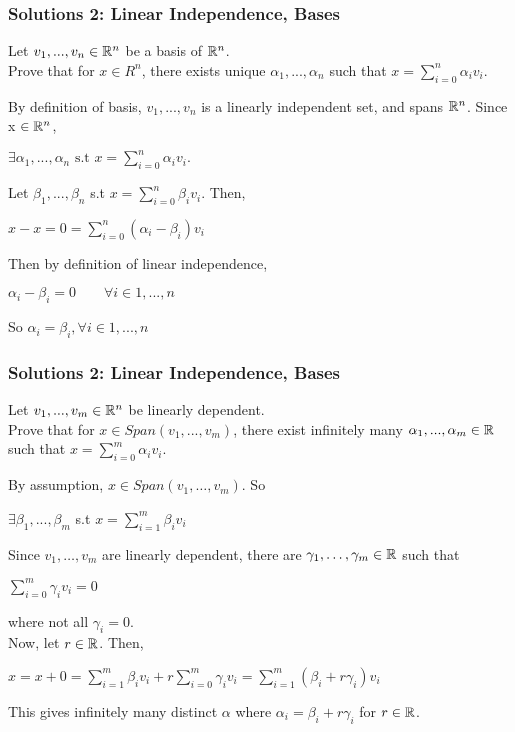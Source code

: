 \documentclass{beamer}
\newcommand\fonteight{\fontsize{8}{9.6}\selectfont}
\renewenvironment{enumerate}%
{\begin{list}{\arabic{enumi}.}%
      {\setlength{\leftmargin}{2.5em}%
       \setlength{\itemsep}{-\parsep}%
       \setlength{\topsep}{-\parskip}%
       \usecounter{enumi}}%
 }{\end{list}}
\begin{document}
\begin{frame}
\frametitle{Solutions 2: Linear Independence, Bases}
\begin{enumerate}
	\item[2.] Let $v_1,...,v_n \in \mathbb{R}^n$ be a basis of $\mathbb{R}^n$. \\
		Prove that for $x \in R^n$, there exists unique $\alpha_1,...,\alpha_n$
		such that $x = \sum_{i=0}^n \alpha_i v_i$.
	\begin{solution}
	By definition of basis, $v_1,...,v_n$ is a linearly independent set, and spans $\mathbb{R}^n$. Since x $\in \mathbb{R}^n$, 
	\begin{center}
		$\exists \alpha_1,...,\alpha_n \text{ s.t } x = \sum_{i=0}^n \alpha_i v_i.$ 
	\end{center}
	Let $\beta_1,...,\beta_n$ s.t $x = \sum_{i=0}^n \beta_i v_i$. Then,
	\begin{center}
		$x-x=0=\sum_{i=0}^n (\alpha_i-\beta_i) v_i$
	\end{center} 
	Then by definition of linear independence, 
	\begin{center}
		$\alpha_i-\beta_i=0  \qquad \forall i \in 1,...,n$
	\end{center}
	So $\alpha_i=\beta_i, \forall i \in 1,...,n$ 
	\end{solution}
\end{enumerate}
\end{frame}

\begin{frame}
\frametitle{Solutions 2: Linear Independence, Bases}
\begin{enumerate}
\item[3.] Let $v_1,...,v_m \in \mathbb{R}^n$ be linearly dependent. \\
Prove that for $x \in Span(v_1,...,v_m)$, 
there exist infinitely many $\alpha_1,...,\alpha_m \in \mathbb{R}$ 
such that $x = \sum_{i=0}^m \alpha_i v_i$.
\begin{solution}
    \fonteight
    By assumption, $x\in Span(v_1,\ldots,v_m)$. So
    \begin{center}
    $\exists \beta_1,...,\beta_m$ s.t $x=\sum_{i=1}^m \beta_iv_i$
    \end{center}
    
    Since $v_1,\ldots,v_m$ are linearly dependent, there are $\gamma_1,\ldots,\gamma_m\in \mathbb{R}$ such that
    \begin{center} $\sum_{i=0}^m\gamma_i v_i= 0$ \end{center}
    where not all $\gamma_i=0$.  \\
    Now, let $r \in \mathbb{R}$. Then,
    \begin{center} $x = x+0 = \sum_{i=1}^m \beta_iv_i + r\sum_{i=0}^m\gamma_i v_i
    =  \sum_{i=1}^m (\beta_i +r\gamma_i)v_i $ \end{center} 
    This gives infinitely many distinct $\alpha$ where $\alpha_i=\beta_i+r\gamma_i$ for $r\in\mathbb{R}$.

\end{solution}
\end{enumerate}
\end{frame}
\end{document}
